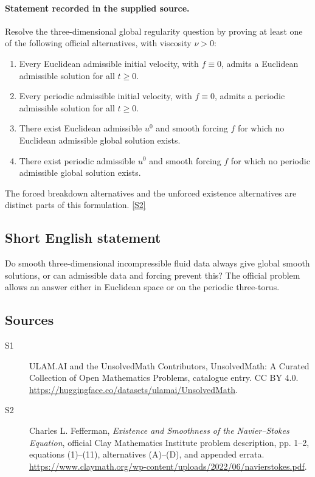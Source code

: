 \documentclass[11pt]{article}
\newcommand{\sref}[2]{\hyperlink{source:#1:#2}{[S#2]}}
\begin{document}
\paragraph{Statement recorded in the supplied source.}
Resolve the three-dimensional global regularity question by proving at least one of the following official alternatives, with viscosity $\nu>0$:
\begin{enumerate}
\item[(A)] Every Euclidean admissible initial velocity, with $f\equiv0$, admits a Euclidean admissible solution for all $t\geq0$.
\item[(B)] Every periodic admissible initial velocity, with $f\equiv0$, admits a periodic admissible solution for all $t\geq0$.
\item[(C)] There exist Euclidean admissible $u^0$ and smooth forcing $f$ for which no Euclidean admissible global solution exists.
\item[(D)] There exist periodic admissible $u^0$ and smooth forcing $f$ for which no periodic admissible global solution exists.
\end{enumerate}
The forced breakdown alternatives and the unforced existence alternatives are distinct parts of this formulation. \sref{statement}{2}

\subsection{Short English statement}
Do smooth three-dimensional incompressible fluid data always give global smooth solutions, or can admissible data and forcing prevent this? The official problem allows an answer either in Euclidean space or on the periodic three-torus.
\subsection{Sources}
\begin{description}
\item[\hypertarget{source:statement:1}{S1}] ULAM.AI and the UnsolvedMath Contributors, UnsolvedMath: A Curated Collection of Open Mathematics Problems, catalogue entry. CC BY 4.0. \url{https://huggingface.co/datasets/ulamai/UnsolvedMath}.
\item[\hypertarget{source:statement:2}{S2}] Charles L. Fefferman, \emph{Existence and Smoothness of the Navier--Stokes Equation}, official Clay Mathematics Institute problem description, pp. 1--2, equations (1)--(11), alternatives (A)--(D), and appended errata. \url{https://www.claymath.org/wp-content/uploads/2022/06/navierstokes.pdf}.
\end{description}
\label{end:statement}
\end{document}
